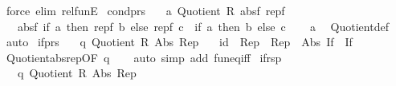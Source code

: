 \begin{isabellebody}
\ {\isacharparenleft}{\kern0pt}force\ elim{\isacharcolon}{\kern0pt}\ rel{\isacharunderscore}{\kern0pt}funE{\isacharparenright}{\kern0pt}{\isacharplus}{\kern0pt}%
\endisatagproof
{\isafoldproof}%
%
\isadelimproof
\isanewline
%
\endisadelimproof
\isanewline
{}\isamarkupfalse%
\ cond{\isacharunderscore}{\kern0pt}prs{\isacharcolon}{\kern0pt}\isanewline
\ \ \ a{\isacharcolon}{\kern0pt}\ {\isachardoublequoteopen}Quotient{}\ R\ absf\ repf{\isachardoublequoteclose}\isanewline
\ \ \ {\isachardoublequoteopen}absf\ {\isacharparenleft}{\kern0pt}if\ a\ then\ repf\ b\ else\ repf\ c{\isacharparenright}{\kern0pt}\ {\isacharequal}{\kern0pt}\ {\isacharparenleft}{\kern0pt}if\ a\ then\ b\ else\ c{\isacharparenright}{\kern0pt}{\isachardoublequoteclose}\isanewline
%
\isadelimproof
\ \ %
\endisadelimproof
%
\isatagproof
{}\isamarkupfalse%
\ a\ \isamarkupfalse%
\ Quotient{}{\isacharunderscore}{\kern0pt}def\ \isamarkupfalse%
\ auto%
\endisatagproof
{\isafoldproof}%
%
\isadelimproof
\isanewline
%
\endisadelimproof
\isanewline
{}\isamarkupfalse%
\ if{\isacharunderscore}{\kern0pt}prs{\isacharcolon}{\kern0pt}\isanewline
\ \ \ q{\isacharcolon}{\kern0pt}\ {\isachardoublequoteopen}Quotient{}\ R\ Abs\ Rep{\isachardoublequoteclose}\isanewline
\ \ \ {\isachardoublequoteopen}{\isacharparenleft}{\kern0pt}id\ {\isacharminus}{\kern0pt}{\isacharminus}{\kern0pt}{\isacharminus}{\kern0pt}{\isachargreater}{\kern0pt}\ Rep\ {\isacharminus}{\kern0pt}{\isacharminus}{\kern0pt}{\isacharminus}{\kern0pt}{\isachargreater}{\kern0pt}\ Rep\ {\isacharminus}{\kern0pt}{\isacharminus}{\kern0pt}{\isacharminus}{\kern0pt}{\isachargreater}{\kern0pt}\ Abs{\isacharparenright}{\kern0pt}\ If\ {\isacharequal}{\kern0pt}\ If{\isachardoublequoteclose}\isanewline
%
\isadelimproof
\ \ %
\endisadelimproof
%
\isatagproof
{}\isamarkupfalse%
\ Quotient{}{\isacharunderscore}{\kern0pt}abs{\isacharunderscore}{\kern0pt}rep{\isacharbrackleft}{\kern0pt}OF\ q{\isacharbrackright}{\kern0pt}\isanewline
\ \ \isamarkupfalse%
\ {\isacharparenleft}{\kern0pt}auto\ simp\ add{\isacharcolon}{\kern0pt}\ fun{\isacharunderscore}{\kern0pt}eq{\isacharunderscore}{\kern0pt}iff{\isacharparenright}{\kern0pt}%
\endisatagproof
{\isafoldproof}%
%
\isadelimproof
\isanewline
%
\endisadelimproof
\isanewline
{}\isamarkupfalse%
\ if{\isacharunderscore}{\kern0pt}rsp{\isacharcolon}{\kern0pt}\isanewline
\ \ \ q{\isacharcolon}{\kern0pt}\ {\isachardoublequoteopen}Quotient{}\ R\ Abs\ Rep{\isachardoublequoteclose}\isanewline

\end{isabellebody}
